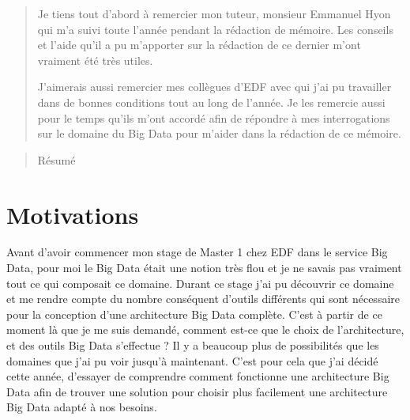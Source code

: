 \documentclass[12pt, twoside, openright]{report}
\newenvironment{acknowledgements} {\renewcommand\abstractname{Remerciements}\begin{abstract}} {\end{abstract}}
\begin{document}
\leavevmode\thispagestyle{empty}\newpage


\begin{acknowledgements}

Je tiens tout d'abord à remercier mon tuteur, monsieur Emmanuel Hyon qui m'a suivi toute l'année pendant la rédaction de mémoire. Les conseils et l'aide qu'il a pu m'apporter sur la rédaction de ce dernier m'ont vraiment été très utiles.

J'aimerais aussi remercier mes collègues d'EDF avec qui j'ai pu travailler dans de bonnes conditions tout au long de l'année. Je les remercie aussi pour le temps qu'ils m'ont accordé afin de répondre à mes interrogations sur le domaine du Big Data pour m'aider dans la rédaction de ce mémoire.

\end{acknowledgements}

\leavevmode\thispagestyle{empty}\newpage


\begin{abstract}
	Résumé
\end{abstract}

\leavevmode\thispagestyle{empty}\newpage


\section*{Motivations}
Avant d'avoir commencer mon stage de Master 1 chez EDF dans le service Big Data, pour moi le Big Data était une notion très flou et je ne savais pas vraiment tout ce qui composait ce domaine. Durant ce stage j'ai pu découvrir ce domaine et me rendre compte du nombre conséquent d'outils différents qui sont nécessaire pour la conception d'une architecture Big Data complète. C'est à partir de ce moment là que je me suis demandé, comment est-ce que le choix de l'architecture, et des outils Big Data s'effectue ? Il y a beaucoup plus de possibilités que les domaines que j'ai pu voir jusqu'à maintenant. C'est pour cela que j'ai décidé cette année, d'essayer de comprendre comment fonctionne une architecture Big Data afin de trouver une solution pour choisir plus facilement une architecture Big Data adapté à nos besoins. 
\end{document}
